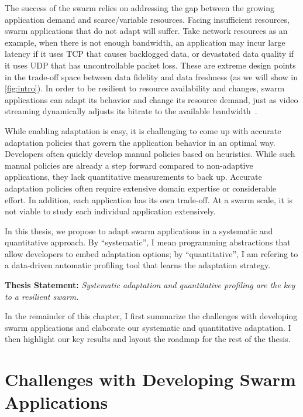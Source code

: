 \documentclass[thesis.tex]{subfiles}
\begin{document}
The success of the swarm relies on addressing the gap between the growing
application demand and scarce/variable resources. Facing insufficient resources,
swarm applications that do not adapt will suffer. Take network resources as an
example, when there is not enough bandwidth, an application may incur large
latency if it uses TCP that causes backlogged data, or devastated data quality
if it uses UDP that has uncontrollable packet loss. These are extreme design
points in the trade-off space between data fidelity and data freshness (as we
will show in \autoref{fig:intro}). In order to be resilient to resource
availability and changes, swarm applications can adapt its behavior and change
its resource demand, just as video streaming dynamically adjusts its bitrate to
the available bandwidth~\cite{michalos2012dynamic}.

While enabling adaptation is easy, it is challenging to come up with accurate
adaptation policies that govern the application behavior in an optimal
way. Developers often quickly develop manual policies based on heuristics. While
such manual policies are already a step forward compared to non-adaptive
applications, they lack quantitative measurements to back up. Accurate
adaptation policies often require extensive domain expertise or considerable
effort. In addition, each application has its own trade-off. At a swarm scale,
it is not viable to study each individual application extensively.

In this thesis, we propose to adapt swarm applications in a systematic and
quantitative approach. By ``systematic'', I mean programming abstractions that
allow developers to embed adaptation options; by ``quantitative'', I am refering
to a data-driven automatic profiling tool that learns the adaptation strategy.

\vspace{1em}

\noindent\textbf{Thesis Statement:} \textit{Systematic adaptation and
  quantitative profiling are the key to a resilient swarm.}

\vspace{1em}

In the remainder of this chapter, I first summarize the challenges with
developing swarm applications and elaborate our systematic and quantitative
adaptation. I then highlight our key results and layout the roadmap for the rest
of the thesis.

\section{Challenges with Developing Swarm Applications}
\label{sec:chall-with-exist}
\end{document}
